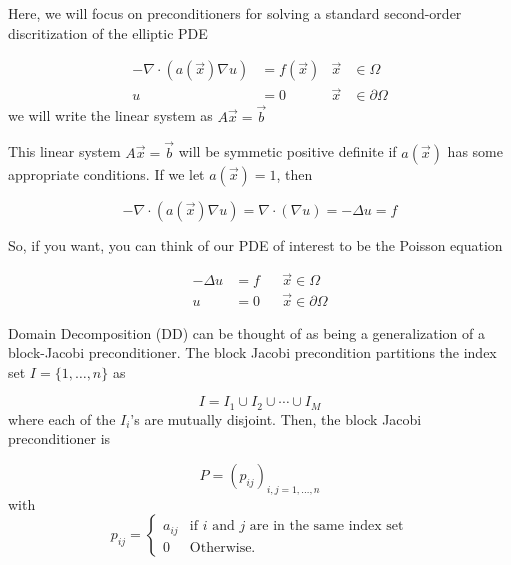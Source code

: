 Here, we will focus on preconditioners for solving a standard second-order discritization of the elliptic PDE

\begin{align*}
    - \nabla \cdot (a(\vec{x})\nabla u) &= f(\vec{x})  & \vec{x} &\in \Omega\\
    u&=0 & \vec{x} &\in \partial \Omega
\end{align*}
we will write the linear system as $A\vec{x}=\vec{b}$


This linear system $A\vec{x}=\vec{b}$ will be symmetic positive definite if $a(\vec{x})$ has some appropriate conditions. If we let $a(\vec{x})=1$, then

\begin{equation*}
    -\nabla \cdot ( a(\vec{x}) \nabla u )= \nabla \cdot (\nabla u) = -\Delta u = f
\end{equation*}

So, if you want, you can think of our PDE of interest to be the Poisson equation

\begin{align*}
    -\Delta u &=f &&\vec{x} \in \Omega \\
    u &= 0 &&\vec{x}\in \partial \Omega
\end{align*}

Domain Decomposition (DD) can be thought of as being a generalization of a block-Jacobi preconditioner. The block Jacobi precondition partitions the index set $I=\{1, \ldots, n\}$ as

\begin{equation*}
    I = I_1 \cup I_2 \cup \cdots \cup I_M
\end{equation*}
where each of the $I_i$'s are mutually disjoint. Then, the block Jacobi preconditioner is

\begin{equation*}
    P = (p_{ij})_{i, j=1, \ldots, n}
\end{equation*}
with
\begin{equation*}
    p_{ij} = \begin{cases}
    a_{ij} & \text{if $i$ and $j$ are in the same index set}\\
    0 & \text{Otherwise.}
\end{cases}
\end{equation*}






